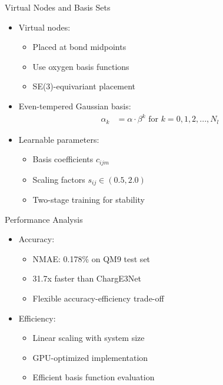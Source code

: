 \begin{frame}{Virtual Nodes and Basis Sets}
    \begin{itemize}
        \item Virtual nodes:
        \begin{itemize}
            \item Placed at bond midpoints
            \item Use oxygen basis functions
            \item SE(3)-equivariant placement
        \end{itemize}
        \item Even-tempered Gaussian basis:
        \begin{align*}
            \alpha_k &= \alpha \cdot \beta^k \text{ for } k = 0,1,2,...,N_l
        \end{align*}
        \item Learnable parameters:
        \begin{itemize}
            \item Basis coefficients $c_{ijm}$
            \item Scaling factors $s_{ij} \in (0.5, 2.0)$
            \item Two-stage training for stability
        \end{itemize}
    \end{itemize}
\end{frame}

\begin{frame}{Performance Analysis}
    \begin{itemize}
        \item Accuracy:
        \begin{itemize}
            \item NMAE: 0.178\% on QM9 test set
            \item 31.7x faster than ChargE3Net
            \item Flexible accuracy-efficiency trade-off
        \end{itemize}
        \item Efficiency:
        \begin{itemize}
            \item Linear scaling with system size
            \item GPU-optimized implementation
            \item Efficient basis function evaluation
        \end{itemize}
    \end{itemize}
\end{frame}

